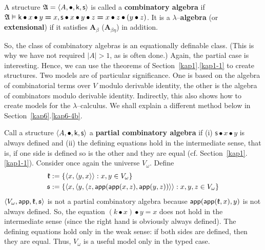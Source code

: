 \begin{defn}
A structure $\mathfrak{A} = \langle A, \bullet,
\mbox{\sf k}, \mbox{\sf s}\rangle$ is called a \textbf{combinatory
algebra} if $\mathfrak{A} \vDash \mbox{\sf k} \bullet x \bullet y \boldsymbol{=} x,
\mbox{\sf s} \bullet x \bullet y \bullet z \boldsymbol{=} x \bullet z
\bullet (y \bullet z)$. It is a
$\lambda$--\textbf{algebra} (or \textbf{extensional}) if it satisfies
$\mathbf{A}_{\beta}$ ($\mathbf{A}_{\beta\eta}$) in addition.
\end{defn}
So, the class of combinatory algebras is an equationally definable
class. (This is why we have not required $|A|>1$, as is often
done.) Again, the partial case is interesting. Hence, we can use
the theorems of Section~\ref{kap1}.\ref{kap1-1} to create structures. Two
models are of particular significance. One is based on the algebra
of combinatorial terms over $V$ modulo derivable identity, the
other is the algebra of combinators modulo derivable identity.
Indirectly, this also shows how to create models for the
$\lambda$--calculus. We shall explain a different method below
in Section~\ref{kap6}.\ref{kap6-4b}.

Call a structure $\langle A, \bullet, \mathsf{k}, \mathsf{s}\rangle$
a \textbf{partial combinatory algebra} if (i) $\mathsf{s} \bullet x
\bullet y$ is always defined and (ii) the defining equations hold
in the intermediate sense, that is, if one side is defined so is
the other and they are equal (cf. Section~\ref{kap1}.\ref{kap1-1}). 
Consider once again the universe $V_{\omega}$. Define
\begin{align}
\mathfrak{k} & := \{\langle x, \langle y, x\rangle\rangle : x, y \in V_{\omega}\} \\
\mathfrak{s} & := \{\langle x, \langle y, \langle z, \mathsf{app}(\mathsf{app}(x,z), 
\mathsf{app}(y,z))\rangle\rangle : x, y, z \in V_{\omega}\}
\end{align}
$\langle V_{\omega}, \mbox{\sf app}, \mathfrak{k}, \mathfrak{s}\rangle$ is not a
partial combinatory algebra because
$\mathsf{app}(\mathsf{app}(\mathfrak{k}, x), y)$ is not always
defined. So, the equation $(k \bullet x) \bullet y \boldsymbol{=} x$ 
does not hold in the intermediate sense (since the right hand is 
obviously always defined). The defining equations hold
only in the weak sense: if both sides are defined, then they are
equal. Thus, $V_{\omega}$ is a useful model only in the typed 
case.

